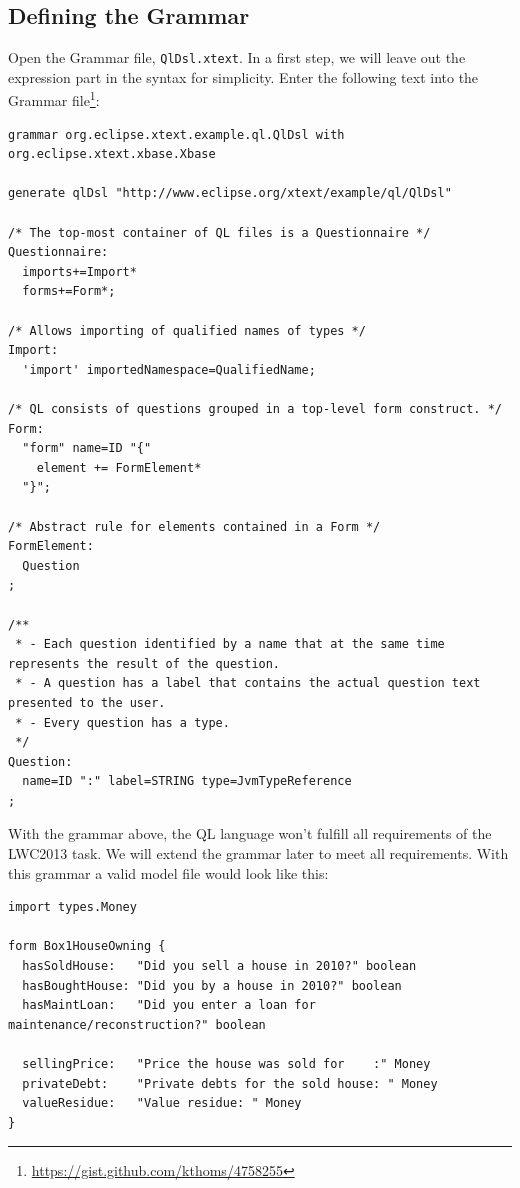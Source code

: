 \label{sec:DefiningGrammar}
\subsection{Defining the Grammar}

Open the Grammar file, \texttt{QlDsl.xtext}. In a first step, we will leave out
the expression part in the syntax for simplicity. Enter the following text into
the Grammar file\footnote{\url{https://gist.github.com/kthoms/4758255}}:

\begin{lstlisting}[language=Xtext]
grammar org.eclipse.xtext.example.ql.QlDsl with org.eclipse.xtext.xbase.Xbase

generate qlDsl "http://www.eclipse.org/xtext/example/ql/QlDsl"

/* The top-most container of QL files is a Questionnaire */
Questionnaire:
  imports+=Import*
  forms+=Form*;

/* Allows importing of qualified names of types */
Import:
  'import' importedNamespace=QualifiedName;

/* QL consists of questions grouped in a top-level form construct. */
Form:
  "form" name=ID "{"
    element += FormElement*
  "}";

/* Abstract rule for elements contained in a Form */
FormElement:
  Question
;

/**
 * - Each question identified by a name that at the same time represents the result of the question.
 * - A question has a label that contains the actual question text presented to the user.
 * - Every question has a type.
 */
Question:
  name=ID ":" label=STRING type=JvmTypeReference
;
\end{lstlisting}

With the grammar above, the QL language won't fulfill all requirements of the
LWC2013 task. We will extend the grammar later to meet all requirements. With
this grammar a valid model file would look like this:

\begin{lstlisting}[language=QL]
import types.Money

form Box1HouseOwning {
  hasSoldHouse:   "Did you sell a house in 2010?" boolean
  hasBoughtHouse: "Did you by a house in 2010?" boolean
  hasMaintLoan:   "Did you enter a loan for maintenance/reconstruction?" boolean
	
  sellingPrice:   "Price the house was sold for    :" Money 
  privateDebt:    "Private debts for the sold house: " Money
  valueResidue:   "Value residue: " Money 
}
\end{lstlisting}


